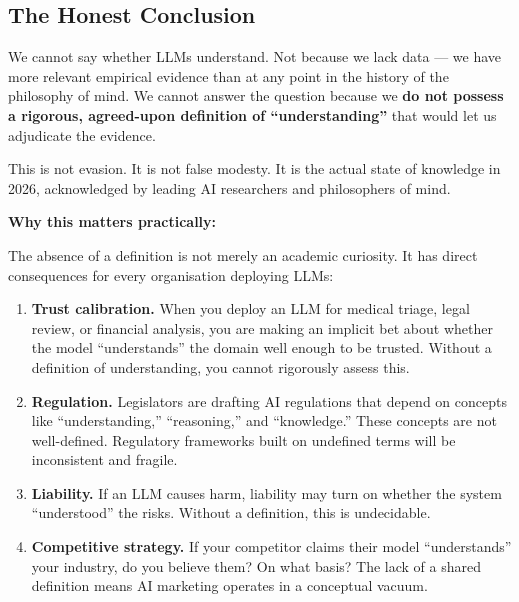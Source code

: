\documentclass[11pt, a4paper]{article}
\begin{document}
\subsection{The Honest Conclusion}

\begin{tcolorbox}[colback=warnbg, colframe=Red, fonttitle=\bfseries,
  title={The Current State of Knowledge}]
We cannot say whether LLMs understand. Not because we lack data --- we
have more relevant empirical evidence than at any point in the history
of the philosophy of mind. We cannot answer the question because we
\textbf{do not possess a rigorous, agreed-upon definition of
``understanding''} that would let us adjudicate the evidence.

This is not evasion. It is not false modesty. It is the actual state of
knowledge in 2026, acknowledged by leading AI researchers and
philosophers of mind.
\end{tcolorbox}

\textbf{Why this matters practically:}

The absence of a definition is not merely an academic curiosity. It has
direct consequences for every organisation deploying LLMs:

\begin{enumerate}[leftmargin=2em]
  \item \textbf{Trust calibration.} When you deploy an LLM for medical
    triage, legal review, or financial analysis, you are making an
    implicit bet about whether the model ``understands'' the domain
    well enough to be trusted. Without a definition of understanding,
    you cannot rigorously assess this.

  \item \textbf{Regulation.} Legislators are drafting AI regulations that
    depend on concepts like ``understanding,'' ``reasoning,'' and
    ``knowledge.'' These concepts are not well-defined. Regulatory
    frameworks built on undefined terms will be inconsistent and fragile.

  \item \textbf{Liability.} If an LLM causes harm, liability may turn on
    whether the system ``understood'' the risks. Without a definition,
    this is undecidable.

  \item \textbf{Competitive strategy.} If your competitor claims their
    model ``understands'' your industry, do you believe them? On what
    basis? The lack of a shared definition means AI marketing operates
    in a conceptual vacuum.
\end{enumerate}
\end{document}
